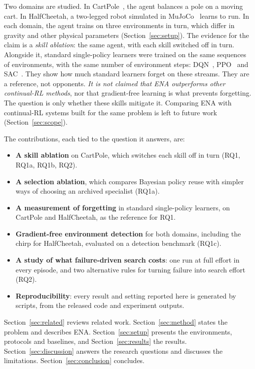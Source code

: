 Two domains are studied. In CartPole~\citep{barto1983neuronlike}, the agent balances a pole on a moving cart. In HalfCheetah, a two-legged robot simulated in MuJoCo~\citep{todorov2012mujoco} learns to run. In each domain, the agent trains on three environments in turn, which differ in gravity and other physical parameters (Section~\ref{sec:setup}). The evidence for the claim is a \textit{skill ablation}: the same agent, with each skill switched off in turn. Alongside it, standard single-policy learners were trained on the same sequences of environments, with the same number of environment steps: DQN~\citep{mnih2015human}, PPO~\citep{schulman2017proximal} and SAC~\citep{haarnoja2018soft}. They show how much standard learners forget on these streams. They are a reference, not opponents. \textit{It is not claimed that ENA outperforms other continual-RL methods}, nor that gradient-free learning is what prevents forgetting. The question is only whether these skills mitigate it. Comparing ENA with continual-RL systems built for the same problem is left to future work (Section~\ref{sec:scope}).

The contributions, each tied to the question it answers, are:
\begin{itemize}
    \item \textbf{A skill ablation} on CartPole, which switches each skill off in turn (RQ1, RQ1a, RQ1b, RQ2).
    \item \textbf{A selection ablation}, which compares Bayesian policy reuse with simpler ways of choosing an archived specialist (RQ1a).
    \item \textbf{A measurement of forgetting} in standard single-policy learners, on CartPole and HalfCheetah, as the reference for RQ1.
    \item \textbf{Gradient-free environment detection} for both domains, including the chirp for HalfCheetah, evaluated on a detection benchmark (RQ1c).
    \item \textbf{A study of what failure-driven search costs}: one run at full effort in every episode, and two alternative rules for turning failure into search effort (RQ2).
    \item \textbf{Reproducibility}: every result and setting reported here is generated by scripts, from the released code and experiment outputs.
\end{itemize}

Section~\ref{sec:related} reviews related work. Section~\ref{sec:method} states the problem and describes ENA. Section~\ref{sec:setup} presents the environments, protocols and baselines, and Section~\ref{sec:results} the results. Section~\ref{sec:discussion} answers the research questions and discusses the limitations. Section~\ref{sec:conclusion} concludes.

